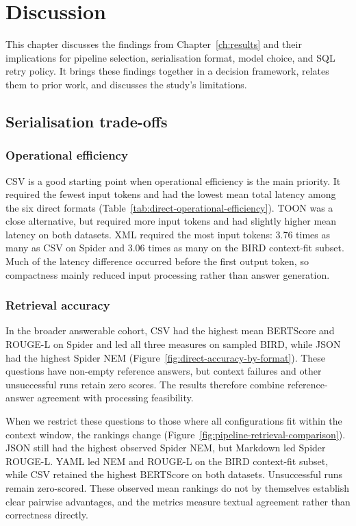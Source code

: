 \chapter{Discussion} \label{ch:discussion}

This chapter discusses the findings from Chapter~\ref{ch:results} and their implications for pipeline selection,
serialisation format, model choice, and SQL retry policy. It brings these findings together in a decision framework,
relates them to prior work, and discusses the study’s limitations.

\section{Serialisation trade-offs} \label{sec:serialization-trade-offs}

\subsection{Operational efficiency}

CSV is a good starting point when operational efficiency is the main priority. It required the fewest input
tokens and had the lowest mean total latency among the six direct formats
(Table~\ref{tab:direct-operational-efficiency}). TOON was a close alternative, but required more input tokens
and had slightly higher mean latency on both datasets. XML required the most input tokens: \num{3.76} times
as many as CSV on Spider and \num{3.06} times as many on the BIRD context-fit subset. Much of the latency
difference occurred before the first output token, so compactness mainly reduced input processing rather than
answer generation.

\subsection{Retrieval accuracy}

In the broader answerable cohort, CSV had the highest mean BERTScore and ROUGE-L on Spider and led all three
measures on sampled BIRD, while JSON had the highest Spider NEM
(Figure~\ref{fig:direct-accuracy-by-format}). These questions have non-empty reference answers, but context
failures and other unsuccessful runs retain zero scores. The results therefore combine reference-answer
agreement with processing feasibility.

When we restrict these questions to those where all configurations fit within the context window, the
rankings change (Figure~\ref{fig:pipeline-retrieval-comparison}). JSON still had the highest observed Spider
NEM, but Markdown led Spider ROUGE-L. YAML led NEM and ROUGE-L on the BIRD context-fit subset, while CSV
retained the highest BERTScore on both datasets. Unsuccessful runs remain zero-scored. These observed mean
rankings do not
by themselves establish clear pairwise advantages, and the metrics measure textual agreement rather than
correctness directly.

